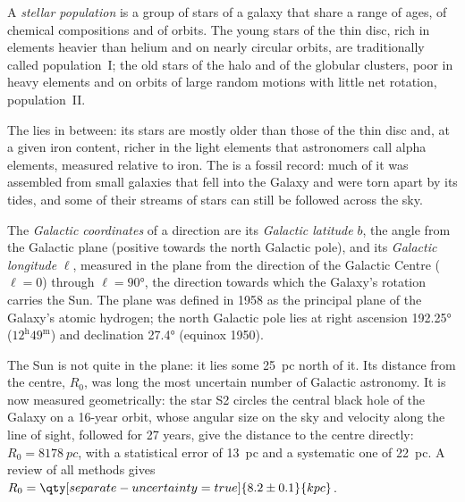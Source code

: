 \begin{definition}\label{def:b3:milky-way-galaxies:populations}
A \emph{stellar population} is a group of stars
of a galaxy that share a range of ages, of chemical compositions and of
orbits. The young stars of the thin disc, rich in elements heavier than
helium and on nearly circular orbits, are traditionally called
population~I; the old stars of the halo and of the globular clusters, poor
in heavy elements and on orbits of large random motions with little net
rotation, population~II.
\end{definition}

The  lies in between: its stars are mostly older than those of
the thin disc and, at a given iron content, richer in the light elements
that astronomers call alpha elements, measured relative to iron. The
 is a
fossil record: much of it was assembled from small galaxies that fell into
the Galaxy and were torn apart by its tides, and some of their streams of
stars can still be followed across the sky.

\begin{definition}\label{def:b3:milky-way-galaxies:coordinates}
The \emph{Galactic coordinates} of a direction
are its \emph{Galactic latitude} $b$, the angle from the Galactic plane
(positive towards the north Galactic pole), and its \emph{Galactic
longitude} $\ell$, measured in the plane from the direction of the
Galactic Centre ($\ell = 0$) through $\ell = \ang{90}$, the direction
towards which the Galaxy's rotation carries the Sun. The plane was
defined in 1958 as the principal plane of the Galaxy's atomic hydrogen;
the north Galactic pole lies at right ascension \ang{192.25}
($12^\mathrm{h}49^\mathrm{m}$) and declination \ang{27.4} (equinox
1950).
\end{definition}

The Sun is not quite in the plane: it lies some \qty{25}{pc} north of it.
Its distance from the centre, $R_0$, was long the most uncertain number of
Galactic astronomy. It is now measured geometrically: the star S2 circles
the central black hole of the Galaxy on a \num{16}-year orbit, whose
angular size on the sky and velocity along the line of sight, followed
for 27 years, give the distance to the centre directly:
$R_0 = \qty{8178}{pc}$, with a statistical error of \qty{13}{pc} and a
systematic one of \qty{22}{pc}. A review of all methods gives
$R_0 = \qty[separate-uncertainty=true]{8.2 \pm 0.1}{kpc}$.

